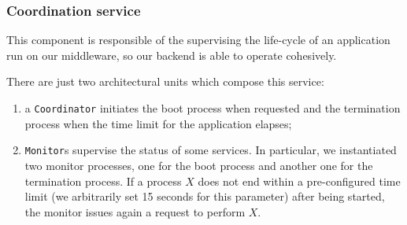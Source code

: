 \subsubsection{Coordination service}

This component is responsible of the supervising the life-cycle of an
application run on our middleware, so our backend is able to operate
cohesively.

There are just two architectural units which compose this service:

\begin{enumerate}
\item a \texttt{Coordinator} initiates the boot process when requested and the
  termination process when the time limit for the application elapses;
\item \texttt{Monitor}s supervise the status of some services. In
  particular, we instantiated two monitor processes, one for the boot process
  and another one for the termination process. If a process $X$ does not end
  within a pre-configured time limit (we arbitrarily set 15 seconds for this
  parameter) after being started, the monitor issues again a request to
  perform $X$.
\end{enumerate}
